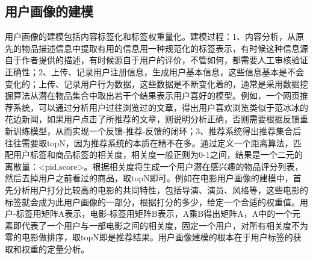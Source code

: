 		\begin{figure}
	    \centering
	      \label{pic:user_profile}
	    \end{figure}

		\subsection{用户画像的建模}
		用户画像的建模包括内容标签化和标签权重量化。建模过程：1、内容分析，从原先的物品描述信息中提取有用的信息用一种规范化的标签表示，有时候这种信息源自于作者提供的描述，有时候源自于用户的评价，不管如何，都需要人工审核验证正确性；2、上传、记录用户注册信息，生成用户基本信息，这些信息基本是不会变化的；上传、记录用户行为数据，这些数据是不断变化着的，通常是采用数据挖掘算法从潜在物品集合中取出若干个结果表示用户喜好的模型。例如，一个网页推荐系统，可以通过分析用户过往浏览过的文章，得出用户喜欢浏览类似于范冰冰的花边新闻，如果用户点击了所推荐的文章，则说明分析正确，否则需要根据反馈重新训练模型，从而实现一个反馈-推荐-反馈的闭环；3、推荐系统得出推荐集合后往往需要取topN，因为推荐系统的本质在精不在多。通过定义一个距离算法，匹配用户标签和商品标签的相关度，相关度一般正则为0-1之间，结果是一个二元的离散量：<pid,score>。根据相关度将生成一个用户潜在感兴趣的物品评分列表，然后去掉用户之前看过的商品，取topN即可。例如在电影用户画像的建模中，首先分析用户打分比较高的电影的共同特性，包括导演、演员、风格等，这些电影的标签就会成为此用户画像的一部分，根据打分的多少，给定一个合适的权重值。用户-标签用矩阵A表示，电影-标签用矩阵B表示，A乘B得出矩阵A，A中的一个元素即代表了一个用户与一部电影之间的相关度，固定一个用户，对所有相关度不为零的电影做排序，取topN即是推荐结果。用户画像建模的根本在于用户标签的获取和权重的定量分析。

